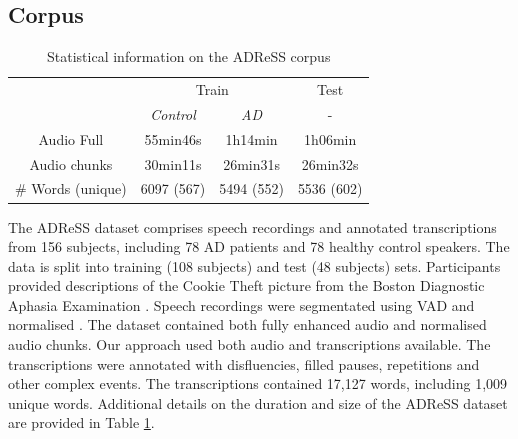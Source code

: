 \subsection{Corpus}
\begin{table}[]
  \begin{center}
   \begin{tabular}{c|ccc}
    \hline
                    & \multicolumn{2}{c}{Train} & Test       \\ \cline{2-4}
                    & \textit{Control}     & \textit{AD}          & -          \\ \hline
  Audio Full        & 55min46s    & 1h14min     & 1h06min    \\
  Audio chunks      & 30min11s    & 26min31s    & 26min32s   \\
  \# Words (unique) & 6097 (567)  & 5494 (552)  & 5536 (602) \\ \hline
  \end{tabular}
  \caption{Statistical information on the ADReSS corpus}
  \label{tab:adress_data}
  \end{center}
  \end{table}
The ADReSS dataset comprises speech recordings and annotated transcriptions from 156 subjects, including 78 \ac{AD} patients and 78 healthy control speakers. The data is split into training (108 subjects) and test (48 subjects) sets. Participants provided descriptions of the Cookie Theft picture from the Boston Diagnostic Aphasia Examination \cite{goodglass2001bdae}. Speech recordings were segmentated using \ac{VAD} and normalised \cite{luz2020alzheimer}. The dataset contained both fully enhanced audio and normalised audio chunks. Our approach used both audio and transcriptions available. The transcriptions were annotated with disfluencies, filled pauses, repetitions and other complex events. The transcriptions contained 17,127 words, including 1,009 unique words. Additional details on the duration and size of the ADReSS dataset are provided in Table \ref{tab:adress_data}.
